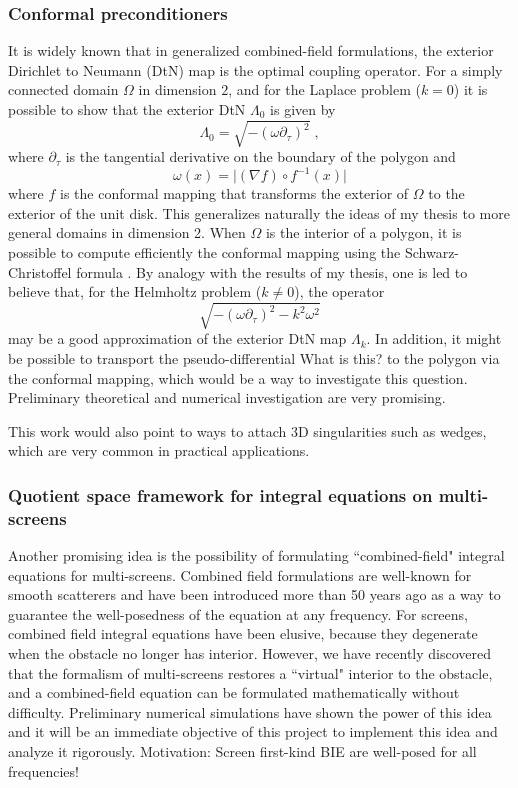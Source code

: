 \documentclass[]{report}
\newcommand{\rh}[1]{{\color{magenta}#1}}
\begin{document}
\subsubsection*{Conformal preconditioners}

It is widely known that in generalized combined-field formulations, the exterior Dirichlet
to Neumann (DtN) map is the optimal coupling operator. For a simply connected domain
$\Omega$ in dimension $2$, and for the Laplace problem ($k = 0$) it is possible to show
that the exterior DtN $\Lambda_0$ is given by
\[\Lambda_0 = \sqrt{-(\omega \partial_\tau)^2}\;,\]
where $\partial_\tau$ is the tangential derivative on the boundary of the polygon
and \[\omega(x) = \lvert (\nabla f) \circ f^{-1}(x)\rvert\] where $f$ is the conformal
mapping that transforms the exterior of $\Omega$ to the exterior of the unit disk. This
generalizes naturally the ideas of my thesis to more general domains in dimension 2. When
$\Omega$ is the interior of a polygon, it is possible to compute efficiently the conformal
mapping using the Schwarz-Christoffel formula \cite{driscoll2002schwarz}. By
analogy with the results of my thesis, one is led to believe that, for the Helmholtz
problem ($k \neq 0$), the operator
\[\sqrt{-(\omega \partial_\tau)^2 - k^2\omega^2}\]
may be a good approximation of the exterior DtN map $\Lambda_k$. In addition, it might be
possible to transport the pseudo-differential \rh{What is this?} to the polygon via the conformal mapping,
which would be a way to investigate this question. Preliminary theoretical and numerical
investigation are very promising.

This work would also point to ways to attach 3D singularities such as wedges, which are
very common  in practical applications.

\subsubsection*{Quotient space framework for integral equations on multi-screens}


Another promising idea is the possibility of formulating ``combined-field" integral
equations for multi-screens. Combined field formulations are well-known for smooth
scatterers and have been introduced more than 50 years ago
\cite{brakhage1965dirichletsehe} as a way to guarantee the well-posedness of the equation
at any frequency. For screens, combined field integral equations have been elusive,
because they degenerate when the obstacle no longer has interior.  However, we have
recently discovered that the formalism of multi-screens restores a ``virtual" interior to
the obstacle, and a combined-field equation can be formulated mathematically without
difficulty. Preliminary numerical simulations have shown the power of this idea and it
will be an immediate objective of this project to implement this idea and analyze it
rigorously.  \rh{Motivation: Screen first-kind BIE are well-posed for all frequencies!}
\end{document}
